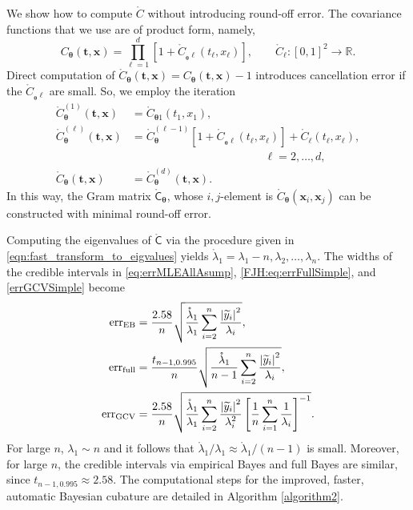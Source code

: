 \documentclass[twocolumn]{svjour3}          %
\newcommand{\bm}[1]{\boldsymbol{#1}}
\newcommand{\reals}{\mathbb{R}}
\newcommand{\rC}{\mathring{C}}
\newcommand{\rlambda}{\mathring{\lambda}}
\newcommand{\vtheta}{{\bm{\theta}}}
\newcommand{\vt}{\bm{t}}
\newcommand{\vx}{\bm{x}}
\newcommand{\rmC}{\mathring{\mathsf{C}}}
\newcommand{\MLE}{\textup{EB}}
\newcommand{\err}{\textup{err}}
\def\abs#1{\ensuremath{\left \lvert #1 \right \rvert}}
\begin{document}
We show how to compute $\rC$ without introducing round-off error.  The covariance functions that we use are of product form, namely,
\begin{equation*}
C_\vtheta(\vt, \vx) = \prod_{\ell=1}^d \left[1 + \rC_{_\vtheta\ell}(t_\ell,x_\ell) \right], \qquad  \rC_\ell:[0,1]^2 \to \reals.
\end{equation*}
Direct computation of $\rC_\vtheta(\vt,\vx) = C_\vtheta(\vt,\vx) -1$ introduces cancellation error if the $ \rC_{_\vtheta \ell}$ are small.  So, we employ the iteration
\begin{align*}
\rC^{(1)}_\vtheta(\vt,\vx) &= \rC_{\vtheta 1}(t_1,x_1),  \\
\rC^{(\ell)}_\vtheta(\vt,\vx) &  = \rC^{(\ell-1)}_\vtheta[1 + \rC_{_\vtheta\ell}(t_\ell,x_\ell)] + \rC_\ell(t_\ell,x_\ell), \\
& \hspace{5cm} \ell = 2, \ldots, d, \\
\rC_\vtheta(\vt,\vx)  & = \rC^{(d)}_\vtheta(\vt,\vx).
\end{align*}
In this way, the Gram matrix $\rmC_\vtheta$, whose $i,j$-element is $\rC_\vtheta(\vx_i,\vx_j)$ can be constructed with minimal round-off error.

Computing the eigenvalues of $\rmC$ via the procedure given in \eqref{eqn:fast_transform_to_eigvalues} yields $\rlambda_1 = \lambda_1 - n, \lambda_2, \ldots, \lambda_n$. The widths of the credible intervals in \eqref{eq:errMLEAllAsump}, \eqref{FJH:eq:errFullSimple}, and   \eqref{errGCVSimple} become
\begin{subequations}
\label{fastStoppingCriterions}
	\begin{align}
\label{fastStoppingCriterionMLE}
\err_\MLE  &
=
\frac{2.58}{n}\sqrt{
	\frac{\rlambda_1}{\lambda_1}
	\sum_{i=2}^{n} \frac{\abs{\widetilde{y}_i}^2}{\lambda_i}  
}, 
\\
\label{fastStoppingCriterionFull}
\err_{\textup{full}} 
& = \frac{t_{n-1,0.995}}{n} \sqrt{
	\frac{\rlambda_1}{n-1} \sum_{i=2}^n \frac{\abs{\widetilde{y}_i}^2}{\lambda_i}
}, \\
\label{fastStoppingCriterionGCV}
\err_{\textup{GCV}} & =
\frac{2.58}{n}\sqrt{	\frac{\rlambda_1}{\lambda_1} \sum_{i=2}^n \frac{\abs{\widetilde{y}_i}^2}{\lambda_i^2}  \left [ \frac 1n \sum_{i=1}^n \frac{1}{\lambda_i} \right]^{-1}} .
	\end{align}
\end{subequations}
For large $n$, $\lambda_1 \sim n$ and it follows that $\rlambda_1/\lambda_1 \approx \rlambda_1/(n-1)$  is small.  Moreover, for large $n$, the credible intervals via empirical Bayes and full Bayes are similar, since $t_{n-1,0.995} \approx 2.58$. 
The computational steps for the improved, faster, automatic Bayesian cubature are detailed in Algorithm \ref{algorithm2}.
\end{document}
